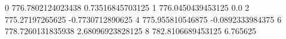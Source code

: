 0 776.7802124023438 0.73516845703125
1 776.0450439453125 0.0
2 775.27197265625 -0.7730712890625
4 775.955810546875 -0.0892333984375
6 778.7260131835938 2.68096923828125
8 782.8106689453125 6.765625
